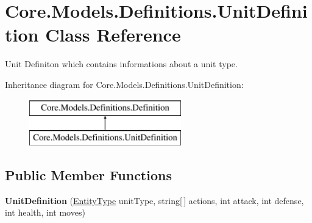 \hypertarget{classCore_1_1Models_1_1Definitions_1_1UnitDefinition}{\section{Core.\-Models.\-Definitions.\-Unit\-Definition Class Reference}
\label{classCore_1_1Models_1_1Definitions_1_1UnitDefinition}
}


Unit Definiton which contains informations about a unit type.  


Inheritance diagram for Core.\-Models.\-Definitions.\-Unit\-Definition\-:\begin{figure}[H]
\begin{center}
\leavevmode
\includegraphics[height=2.000000cm]{classCore_1_1Models_1_1Definitions_1_1UnitDefinition}
\end{center}
\end{figure}
\subsection*{Public Member Functions}
\begin{DoxyCompactItemize}
\item 
\hypertarget{classCore_1_1Models_1_1Definitions_1_1UnitDefinition_aabb22d9859f7268641bd815cf23e0cfa}{{\bfseries Unit\-Definition} (\hyperlink{namespaceCore_1_1Models_1_1Definitions_a609ed13db028308ebc6c5fbd98615fdc}{Entity\-Type} unit\-Type, string\mbox{[}$\,$\mbox{]} actions, int attack, int defense, int health, int moves)}\label{classCore_1_1Models_1_1Definitions_1_1UnitDefinition_aabb22d9859f7268641bd815cf23e0cfa}

\end{DoxyCompactItemize}
